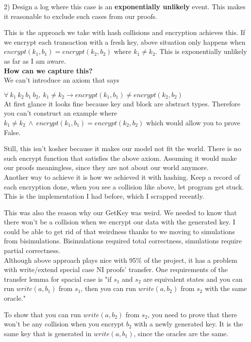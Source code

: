 \documentclass[onecolumn]{paper}
\begin{document}
		2) Design a log where this case is an {\bf exponentially unlikely} event. 
		This makes it reasonable to exclude such cases from our proofs.
		
		This is the approach we take with hash collisions and encryption achieves this.
		If we encrypt each transaction with a fresh key, above situation only happens when $encrypt(k_1, b_1) = encrypt (k_2, b_2)$ where $k_1 \ne k_2$. This is exponentially unlikely as far as I am aware.\\
		
		{\bf How can we capture this?}\\		
		We can't introduce an axiom that says 
		
		$\forall\ k_1\ k_2\ b_1\ b_2,\ k_1 \ne k_2 \rightarrow encrypt(k_1, b_1) \ne encrypt(k_2, b_2)$\\
		
		At first glance it looks fine because key and block are abstract types. 
		Therefore you can't construct an example where $k_1 \ne k_2\ \wedge\ encrypt(k_1, b_1) = encrypt(k_2, b_2)$ which would allow you to prove False.
		 
		Still, this isn't kosher because it makes our model not fit the world. There is no such encrypt function that satisfies the above axiom. Assuming it would make our proofs meaningless, since they are not about our world anymore.\\
		
		Another way to achieve it is how we achieved it with hashing. Keep a record of each encryption done, when you see a collision like above, let program get stuck. This is the implementation I had before, which I scrapped recently. 
		
		This was also the reason why our GetKey was weird. We needed to know that there won't be a collision when we encrypt our data with the generated key. I could be able to get rid of that weirdness thanks to we moving to simulations from bisimulations.
		Bisimulations required total correctness, simulations require partial correctness.\\
		
		Although above approach plays nice with 95\% of the project, it has a problem with write/extend special case NI proofs' transfer.
		One requirements of the transfer lemma for spacial case is "if $s_1$ and $s_2$ are equivalent states and you can run $write(a, b_1)$ from $s_1$, then you can run $write(a, b_2)$ from $s_2$ with the same oracle."
		
		To show that you can run $write(a, b_2)$ from $s_2$, you need to prove that there won't be any collision when you encrypt $b_2$ with a newly generated key. It is the same key that is generated in $write(a, b_1)$, since the oracles are the same.
		
\end{document}
